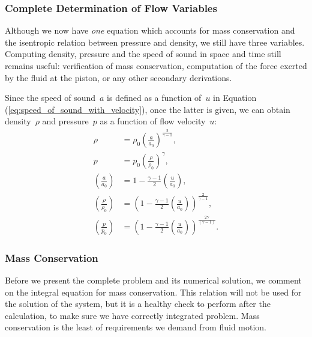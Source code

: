 \documentclass[../../thesis.tex]{subfiles}
\begin{document}
\subsubsection{Complete Determination of Flow Variables}
Although we now have \textit{one} equation which accounts for mass conservation and the isentropic relation between pressure and density, we still have three variables. 
Computing density, pressure and the speed of sound in space and time still remains useful: 
verification of mass conservation, computation of the force exerted by the fluid at the piston, or any other secondary derivations.

Since the speed of sound~$a$ is defined as a function of~$u$ in Equation (\ref{eq:speed_of_sound_with_velocity}),
once the latter is given, we can obtain density~$\rho$ and pressure~$p$ as a function of flow velocity~$u$:
\begin{subequations}
    \begin{align}
        \rho &= \rho_0 \left(\frac{a}{a_0}\right)^{\frac{2}{\gamma-1}},
        \\
        p    &= p_0 \left(\frac{\rho}{\rho_0}\right)^{\gamma},
        \\[2mm]
        \left(\frac{a}{a_0}\right) &= 1 - \frac{\gamma-1}{2}\left(\frac{u}{a_0}\right), 
        \\[2mm]
        \left(\frac{\rho}{\rho_0}\right) &= \left(1 - \frac{\gamma-1}{2}\left(\frac{u}{a_0}\right)\right)^{\frac{2}{\gamma-1}},
        \label{eq:density_as_a_function_of_speed}
        \\[2mm]
        \left(\frac{p}{p_0}\right) &= \left(1 - \frac{\gamma-1}{2}\left(\frac{u}{a_0}\right)\right)^{\frac{2\gamma}{\left(\gamma-1\right)}}.
    \end{align}
\end{subequations}

\subsubsection{Mass Conservation}
\label{sec:mass_conservation_definition}
Before we present the complete problem and its numerical solution, we comment 
on the integral equation for mass conservation.
This relation will not be used for the solution of the system, but it is a 
healthy check to perform after the calculation, to make sure we have 
correctly integrated problem.
Mass conservation is the least of requirements we demand from fluid motion.
\end{document}
